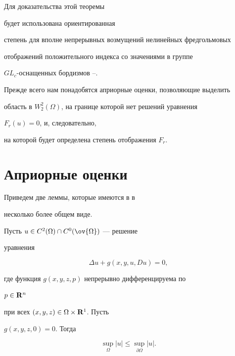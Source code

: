 Для доказательства этой теоремы 


будет использована ориентированная


степень для вполне непрерывных возмущений нелинейных фредгольмовых


отображений положительного индекса со значениями в группе


$GL_c$-оснащенных бордизмов \cite{moe1}--\cite{moe0}.


Прежде всего нам понадобятся априорные оценки, позволяющие выделить


область в $W^2_2(\Omega)$, на границе которой нет решений уравнения


$F_r(u)=0$, и, следовательно,


на которой будет определена степень отображения $F_r$.





\section{Априорные оценки}\label{apr}





Приведем две леммы, которые имеются в \cite{moe} в


несколько более общем виде.





\begin{lem}


\label{l2'}


Пусть $u\in C^2(\Omega)\cap C^0(\ov{\Omega })$ --- решение


уравнения


\begin{equation}


\label{u1}


\Delta u+g(x,y,u,Du)=0,


\end{equation}


где функция $g(x,y,z,p)$ непрерывно дифференцируема по


$p\in {\bold R^n}$ 


при всех $(x,y,z)\in \Omega \times {\bold R^1}$. Пусть


$g(x,y,z,0)=0$. Тогда


$$


\sup_{\Omega }|u|\le \sup_{\partial \Omega }|u|.


$$


\end{lem}





